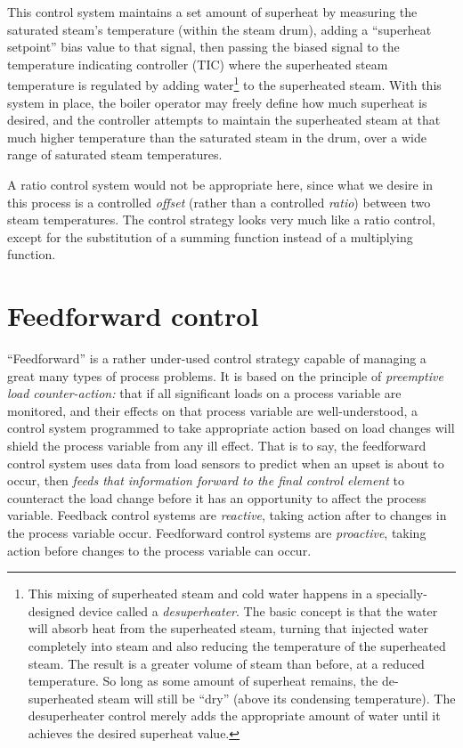 This control system maintains a set amount of superheat by measuring the saturated steam's temperature (within the steam drum), adding a ``superheat setpoint'' bias value to that signal, then passing the biased signal to the temperature indicating controller (TIC) where the superheated steam temperature is regulated by adding water\footnote{This mixing of superheated steam and cold water happens in a specially-designed device called a \textit{desuperheater}.  The basic concept is that the water will absorb heat from the superheated steam, turning that injected water completely into steam and also reducing the temperature of the superheated steam.  The result is a greater volume of steam than before, at a reduced temperature.  So long as some amount of superheat remains, the de-superheated steam will still be ``dry'' (above its condensing temperature).  The desuperheater control merely adds the appropriate amount of water until it achieves the desired superheat value.} to the superheated steam.  With this system in place, the boiler operator may freely define how much superheat is desired, and the controller attempts to maintain the superheated steam at that much higher temperature than the saturated steam in the drum, over a wide range of saturated steam temperatures.  

A ratio control system would not be appropriate here, since what we desire in this process is a controlled \textit{offset} (rather than a controlled \textit{ratio}) between two steam temperatures.  The control strategy looks very much like a ratio control, except for the substitution of a summing function instead of a multiplying function.








\filbreak
\section{Feedforward control}

``Feedforward'' is a rather under-used control strategy capable of managing a great many types of process problems.  It is based on the principle of \textit{preemptive load counter-action:} that if all significant loads on a process variable are monitored, and their effects on that process variable are well-understood, a control system programmed to take appropriate action based on load changes will shield the process variable from any ill effect.  That is to say, the feedforward control system uses data from load sensors to predict when an upset is about to occur, then \textit{feeds that information forward to the final control element} to counteract the load change before it has an opportunity to affect the process variable.  Feedback control systems are \textit{reactive}, taking action after to changes in the process variable occur.  Feedforward control systems are \textit{proactive}, taking action before changes to the process variable can occur.

